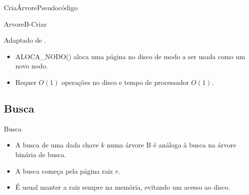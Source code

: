 \documentclass[aspectratio=169]{beamer}
\begin{document}
{\begin{frame}{CriaÁrvore}{Pseudocódigo}
\begin{algorithm}[H]
\caption{ArvoreB-Criar} 
\label{B-Tree-Create}
\end{algorithm}
\tiny{Adaptado de \cite{Cormen2012}.}
\begin{itemize}
 \item ALOCA\_NODO() aloca uma página no disco de modo a ser usada como um novo nodo.
 \item Requer $O(1)$ operações no disco e tempo de processador $O(1)$.
\end{itemize}
\end{frame}

\subsection{Busca}

\begin{frame}{Busca}
\begin{itemize}
 \item A busca de uma dada chave $k$ numa árvore B é análoga à busca na árvore binária de busca. 
 \item A busca começa pela página raiz $r$. 
 \item É usual manter a raiz sempre na memória, evitando um acesso ao disco. 
\end{itemize}
\end{frame}


}
\end{document}
